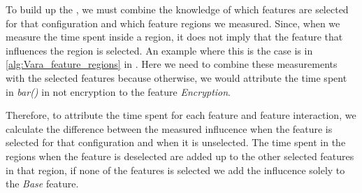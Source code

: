 To build up the {\perfInfluenceModel}, we must combine the knowledge of which features are selected for that configuration and which 
feature regions we measured. Since, when we measure the time spent inside a region, 
it does not imply that the feature that influences the region is selected. 
An example where this is the case is in \autoref{alg:Vara_feature_regions} in .
Here we need to combine these measurements with the selected features because otherwise,
we would attribute the time spent in \emph{bar()} in not encryption to the feature \emph{Encryption}.

Therefore, to attribute the time spent for each feature and feature interaction, we calculate the difference 
between the measured influcence when the feature is selected for that configuration and when it is unselected. 
The time spent in the regions when the feature is deselected are added up to the other selected features in that region, if
none of the features is selected we add the influcence solely to the \emph{Base} feature.
